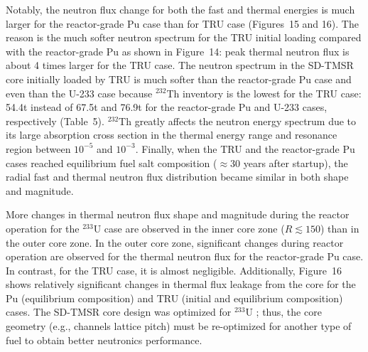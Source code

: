 \documentclass[answers,11pt]{exam}
\begin{document}
\begin{questions}
\begin{solution}
				Notably, the neutron flux change for both the fast and thermal 
				energies is 
				much larger for the reactor-grade Pu case than for TRU case 
				(Figures~15 and 16). The 
				reason is the 
				much softer neutron spectrum for the TRU initial loading 
				compared with the 
				reactor-grade Pu as shown in 
				Figure~14: peak thermal 
				neutron flux is about 4 times larger for the TRU case. The 
				neutron spectrum in 
				the SD-TMSR core initially loaded by TRU is much softer than 
				the reactor-grade 
				Pu case and even than the U-233 case because $^{232}$Th 
				inventory is the 
				lowest for the TRU case: 54.4t instead of 67.5t  and 76.9t for 
				the  
				reactor-grade Pu and U-233 cases, respectively 
				(Table~5). 
				$^{232}$Th greatly affects the neutron energy spectrum due to 
				its large 
				absorption cross section in the thermal energy range and 
				resonance region 
				between $10^{-5}$ and $10^{-3}$. Finally, when the TRU and the 
				reactor-grade 
				Pu cases reached equilibrium fuel salt composition ($\approx 
				30$ years after 
				startup), the radial fast and thermal neutron flux 
				distribution became similar 
				in both shape and magnitude.
				
				More changes in thermal neutron flux shape and magnitude 
				during the reactor 
				operation for the $^{233}$U case are observed in the inner 
				core zone 
				($R\lesssim150$) than in the outer core zone. In the outer 
				core zone, 
				significant changes during reactor operation are observed for 
				the thermal 
				neutron flux for the reactor-grade Pu case. In contrast, for 
				the TRU case, it 
				is almost negligible. Additionally, 
				Figure~16 shows 
				relatively significant changes in thermal flux leakage from 
				the core for the 
				Pu (equilibrium composition) and TRU (initial and equilibrium 
				composition) 
				cases. The SD-TMSR core design was optimized for $^{233}$U  
				\cite{li_optimization_2018}; thus, the core geometry (e.g., 
				channels lattice 
				pitch) must be re-optimized for another type of fuel to obtain 
				better 
				neutronics performance.
        \end{solution}


\end{questions}
\end{document}

